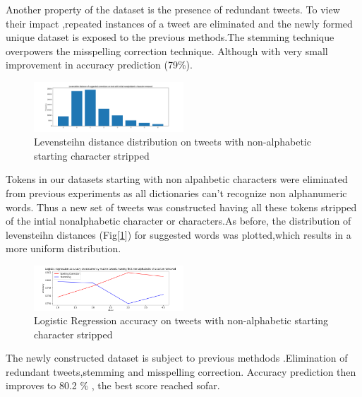 \documentclass[10pt,conference,compsocconf]{IEEEtran}
\begin{document}
Another property of the dataset is the presence of redundant tweets. To view their impact ,repeated instances of a tweet are eliminated and the newly formed unique dataset is exposed to the previous methods.The stemming technique overpowers the misspelling correction technique. Although with very small improvement in accuracy prediction (79\%).

\begin{figure}[!htb]
	\centering \includegraphics[width=0.5\textwidth]{../plots/distributionB.png}
	\caption{Levensteihn distance distribution on tweets with non-alphabetic starting character stripped}
	\label{levDistB}
\end{figure}

Tokens in our datasets starting with non alpahbetic characters were eliminated from previous experiments as all dictionaries can't recognize non alphanumeric words. Thus a new set of tweets was constructed having all these tokens stripped of the intial nonalphabetic character or characters.As before, the distribution of levensteihn distances (Fig[\ref{levDistB}]) for suggested words was plotted,which results in a more uniform distribution.

\begin{figure}[!htb]
	\centering \includegraphics[width=0.5\textwidth]{../plots/filtered_text.png}
	\caption{Logistic Regression accuracy on tweets with non-alphabetic starting character stripped }
	\label{filtered}
\end{figure}

The newly constructed dataset is subject to previous methdods .Elimination of redundant tweets,stemming and misspelling correction. Accuracy prediction then improves to 80.2 \% , the best score reached sofar.
\end{document}
